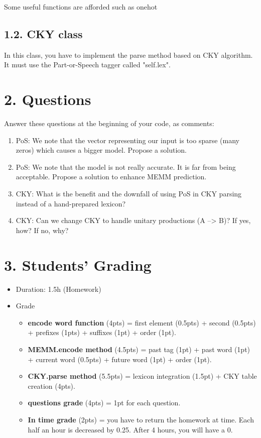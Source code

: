 \documentclass[11pt, a4paper]{article}
\begin{document}
Some useful functions are afforded such as onehot 


\subsection*{1.2. CKY class}

In this class, you have to implement the parse method based on CKY algorithm.
It must use the Part-or-Speech tagger called "self.lex".


\section*{2. Questions}

Answer these questions at the beginning of your code, as comments:
\begin{enumerate}
	\item PoS: We note that the vector representing our input is too sparse (many zeros) which causes a bigger model.
	Propose a solution.
	
	\item PoS: We note that the model is not really accurate.
	It is far from being acceptable.
	Propose a solution to enhance MEMM prediction.
	
	\item CKY: What is the benefit and the downfall of using PoS in CKY parsing instead of a hand-prepared lexicon?
	
	\item CKY: Can we change CKY to handle unitary productions (A --> B)? If yes, how? If no, why?
	
\end{enumerate}


\section*{3. Students' Grading}

\begin{itemize}
	\item Duration: 1.5h (Homework)
	\item Grade
	\begin{itemize}
		\item \textbf{encode word function} (4pts) = first element (0.5pts) + second (0.5pts) + prefixes (1pts) + suffixes (1pt) + order (1pt).
		\item \textbf{MEMM.encode method} (4.5pts) = past tag (1pt) + past word (1pt) + current word (0.5pts) + future word (1pt) + order (1pt).
		\item \textbf{CKY.parse method} (5.5pts) = lexicon integration (1.5pt) + CKY table creation (4pts).
		\item \textbf{questions grade} (4pts) = 1pt for each question.
		\item \textbf{In time grade} (2pts) = you have to return the homework at time. 
		Each half an hour is decreased by 0.25.
		After 4 hours, you will have a 0.
	\end{itemize}
\end{itemize}
\end{document}
